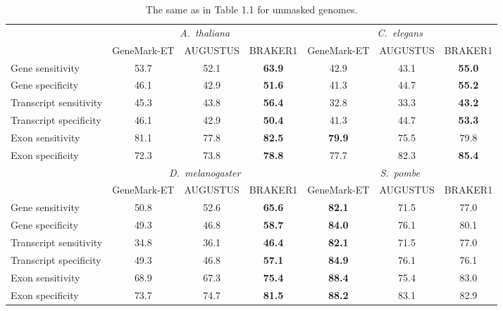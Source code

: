 \documentclass[a4paper,10pt]{report}
\begin{document}
\begin{table}[h!]
\begin{center}
 \begin{scriptsize}
 \begin{tabular}{|l|ccc|ccc|}
 \hline
& \multicolumn{3}{|c|}{\textit{A.~thaliana}} & \multicolumn{3}{|c|}{\textit{C.~elegans}}\\
& GeneMark-ET & AUGUSTUS & BRAKER1 & GeneMark-ET & AUGUSTUS & BRAKER1\\
\hline
Gene sensitivity        & 53.7 & 52.1 & \textbf{63.9} & 42.9 & 43.1 & \textbf{55.0}\\
Gene specificity        & 46.1 & 42.9 & \textbf{51.6} & 41.3 & 44.7 & \textbf{55.2}\\
Transcript sensitivity  & 45.3 & 43.8 & \textbf{56.4} & 32.8 & 33.3 & \textbf{43.2}\\
Transcript specificity  & 46.1 & 42.9 & \textbf{50.4} & 41.3 & 44.7 & \textbf{53.3}\\
Exon sensitivity        & 81.1 & 77.8 & \textbf{82.5} & \textbf{79.9} & 75.5 & 79.8\\
Exon specificity        & 72.3 & 73.8 & \textbf{78.8} & 77.7 & 82.3 & \textbf{85.4}\\
\hline
& \multicolumn{3}{|c|}{\textit{D.~melanogaster}} & \multicolumn{3}{|c|}{\textit{S.~pombe}}\\
& GeneMark-ET & AUGUSTUS & BRAKER1 & GeneMark-ET & AUGUSTUS & BRAKER1\\
\hline
Gene sensitivity       & 50.8 & 52.6 & \textbf{65.6} & \textbf{82.1} & 71.5 & 77.0\\
Gene specificity       & 49.3 &  46.8& \textbf{58.7} & \textbf{84.0} & 76.1 & 80.1\\
Transcript sensitivity & 34.8 & 36.1 & \textbf{46.4} & \textbf{82.1} & 71.5 & 77.0\\
Transcript specificity & 49.3 & 46.8 & \textbf{57.1} & \textbf{84.9} & 76.1 & 76.1\\
Exon sensitivity       & 68.9 & 67.3 & \textbf{75.4} & \textbf{88.4} & 75.4 & 83.0\\
Exon specificity       & 73.7 & 74.7 & \textbf{81.5} & \textbf{88.2} & 83.1 & 82.9\\
\hline
 \end{tabular}
\end{scriptsize}
\end{center}
\caption{The same as in Table 1.1 for unmasked genomes.\label{unmasked}}
\end{table}
\end{document}
